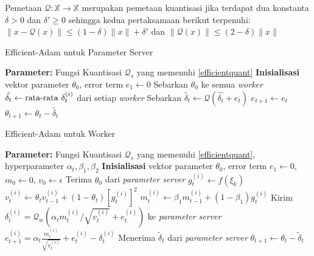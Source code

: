\begin{definition}
  \label{efficientquant}
  Pemetaan $\mathcal{Q}: \mathbb{X} \to \mathbb{X}$ merupakan pemetaan kuantisasi jika terdapat dua konstanta $\delta > 0$ dan $\delta' \geq 0$ sehingga kedua pertaksamaan berikut terpenuhi: $\|x-\mathcal{Q}(x)\| \leq (1-\delta)\|x\| + \delta'$ dan $\|\mathcal{Q}(x)\| \leq (2-\delta)\|x\|$
\end{definition}

\begin{algorithm}[H]
  \caption{Efficient-Adam untuk Parameter Server}\label{efficientps}
  \begin{algorithmic}[1]
    \State \textbf{Parameter:} Fungsi Kuantisasi $\mathcal{Q}_s$ yang memenuhi \autoref{efficientquant}
    \State \textbf{Inisialisasi} vektor parameter $\theta_0$, error term $e_1 \gets 0$
    \State Sebarkan $\theta_0$ ke semua \textit{worker}
    \State $\hat{\delta_t} \gets \textnormal{rata-rata } \delta_t^{(i)}$ dari setiap \textit{worker}
    \State Sebarkan $\tilde{\delta_t} \gets \mathcal{Q}(\hat{\delta_t} + e_t)$
    \State $e_{t+1} \gets e_{t}$
    \State $\theta_{t+1} \gets \theta_t - \tilde{\delta_t}$
    \EndFor
  \end{algorithmic}
\end{algorithm}

\begin{algorithm}[H]
  \caption{Efficient-Adam untuk Worker}\label{efficientwk}
  \begin{algorithmic}[1]
    \State \textbf{Parameter:} Fungsi Kuantisasi $\mathcal{Q}_s$ yang memenuhi \autoref{efficientquant}, hyperparameter $\alpha_t, \beta_1, \beta_2$
    \State \textbf{Inisialisasi} vektor parameter $\theta_0$, error term $e_1 \gets 0$, $m_0 \gets 0$, $v_0 \gets \epsilon$
    \State Terima $\theta_0$ dari \emph{parameter server}
    \State $g_t^{(i)} \gets f(\xi_k)$
    \State $v_t^{(i)} \gets \theta_t v_{t-1}^{(i)} + (1-\theta_t)[g_t^{(i)}]^2$
    \State $m_t^{(i)} \gets \beta_1 m_{t-1}^{(i)} + (1 - \beta_1)g_t^{(i)}$
    \State Kirim $\delta_t^{(i)} = \mathcal{Q}_w(\alpha_t m_t^{(i)} / \sqrt{v_t^{(i)}} + e_t^{(i)})$ ke \emph{parameter server}
    \State $e_{t+1}^{(i)} = \alpha_t \frac{m_t^{(i)}}{\sqrt{v_t^{(i)}}} + e_t^{(i)} - \delta_t^{(i)}$
    \State Menerima $\tilde{\delta}_t$ dari \emph{parameter server}
    \State $\theta_{t+1} \gets \theta_t - \tilde{\delta}_t$
    \EndFor
  \end{algorithmic}
\end{algorithm}
